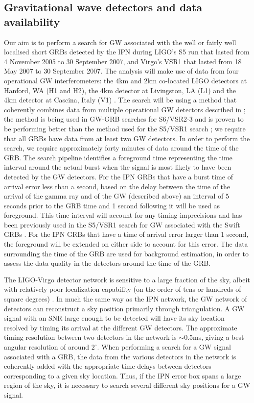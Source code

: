 \documentclass[a4paper]{jpconf}
\begin{document}
\subsection{Gravitational wave detectors and data availability}
Our aim is to perform a search for GW associated with the well or fairly well localised short GRBs detected by the IPN during LIGO's S5 run that lasted from 4 November 2005 to 30 September 2007, and Virgo's VSR1 that lasted from 18 May 2007 to 30 September 2007. The analysis will make use of data from four operational GW interferometers: the 4km and 2km co-located LIGO detectors at Hanford, WA (H1 and H2), the 4km detector at Livingston, LA (L1) and the 4km detector at Cascina, Italy (V1) \cite{Abbott:2007kv, Abadie:2010px, virgostatus}. The search will be using a method that coherently combines data from multiple operational GW detectors described in \cite{Harry:2010fr}; the method is being used in GW-GRB searches for S6/VSR2-3 \cite{lvc:s6grb} and is proven to be performing better than the method used for the S5/VSR1 search \cite{Harry:2010fr, Abadie:2010uf, Collaboration:2009kk}; we require that all GRBs have data from at least two GW detectors. In order to perform the search, we require approximately forty minutes of data around the time of the GRB. The search pipeline identifies a foreground time representing the time interval around the actual burst when the signal is most likely to have been detected by the GW detectors. For the IPN GRBs that have a burst time of arrival error less than a second, based on the delay between the time of the arrival of the gamma ray and of the GW (described above) an interval of 5 seconds prior to the GRB time and 1 second following it will be used as foreground. This time interval will account for any timing imprecisions and has been previously used in the S5/VSR1 search for GW associated with the Swift GRBs \cite{Abadie:2010uf}. For the IPN GRBs that have a time of arrival error larger than 1 second, the foreground will be extended on either side to account for this error.  The data surrounding the time of the GRB are used for background estimation, in order to assess the data quality in the detectors around the time of the GRB. 

The LIGO-Virgo detector network \cite{Abbott:2007kv, Abadie:2010px, virgostatus} is sensitive to a large fraction of the sky, albeit with relatively poor localization capability (on the order of tens or hundreds of square degrees)
\cite{Fairhurst:2010is}. In much the same way as the IPN network, the GW network of detectors can reconstruct a sky position primarily through triangulation. A GW signal with an SNR large enough to be detected will have its sky location resolved by timing its arrival at the different GW detectors.  The approximate timing resolution between two detectors in the network is $\sim$0.5ms, giving a best angular resolution of around $2^\circ$.  When performing a search for a GW signal associated with a GRB, the data from the various detectors in the network is coherently added with the appropriate time delays between detectors corresponding to a given sky location.  Thus, if the IPN error box spans a large region of the sky, it is necessary to search several different sky positions for a GW signal.
\end{document}
